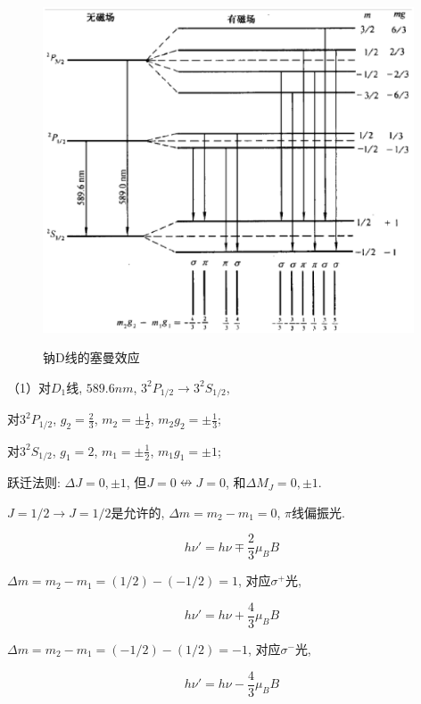 \begin{figure}[h]
\begin{center}
  \includegraphics[width=11cm]{Spectrum/splitting_of_D_line.ps}\\
  \caption{钠D线的塞曼效应}\label{Splitting of Na D lines}
\end{center}
\end{figure}



（1）对$D_1$线, $589.6 nm$, $3^2P_{1/2} \to 3^2S_{1/2}$,

对$3^2P_{1/2}$, $g_2 = \frac{2}{3}$, $m_2=\pm \frac{1}{2}$,
$m_2g_2=\pm \frac{1}{3} $;

对$3^2S_{1/2}$, $g_1 = 2$, $m_1=\pm \frac{1}{2}$, $m_1g_1=\pm 1$;

跃迁法则: $\Delta J =0, \pm1$, 但$J=0 \nleftrightarrow J=0$,
和$\Delta M_J =0, \pm 1$.

$J=1/2 \rightarrow J=1/2$是允许的, $\Delta m = m_2 -m_1 =0$,
$\pi$线偏振光.

\begin{equation*}
h\nu' = h\nu \mp \frac{2}{3}\mu_B B
\end{equation*}


$\Delta m = m_2 - m_1 =(1/2) - (-1/2)=1$, 对应$\sigma^+$光,

\begin{equation*}
h\nu' = h\nu + \frac{4}{3}\mu_B B
\end{equation*}


$\Delta m = m_2 - m_1 =(-1/2) - (1/2)=-1$, 对应$\sigma^-$光,


\begin{equation*}
h\nu' = h\nu - \frac{4}{3}\mu_B B
\end{equation*}


